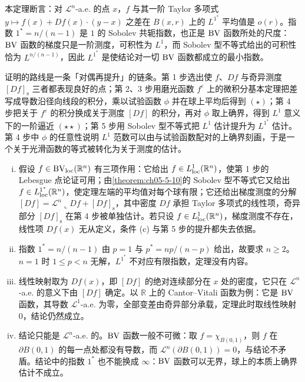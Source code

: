 \documentclass[../../main.tex]{subfiles}%
\begin{document}
\begin{remark}\label{remark:ch06-thm-6-1-动机}
本定理断言：对 $\mathcal{L}^n$-a.e. 的点 $x$，$f$ 与其一阶 Taylor 多项式 $y\mapsto f(x)+Df(x)\cdot(y-x)$ 之差在 $B(x,r)$ 上的 $L^{1^{*}}$ 平均值是 $o(r)$。指数 $1^{*}=n/(n-1)$ 是 $1$ 的 Sobolev 共轭指数，也正是 $\mathrm{BV}$ 函数所处的尺度：$\mathrm{BV}$ 函数的梯度只是一阶测度，可积性为 $L^1$，而 Sobolev 型不等式给出的可积性恰为 $L^{n/(n-1)}$，因此 $L^{1^{*}}$ 是使结论对一切 $\mathrm{BV}$ 函数都成立的最小指数。

证明的路线是一条「对偶再提升」的链条。第 1 步选出使 $f$、$Df$ 与奇异测度 $[Df]_{\mathrm{s}}$ 三者都表现良好的点；第 2、3 步用磨光函数 $f^\varepsilon$ 上的微积分基本定理把差写成导数沿径向线段的积分，乘以试验函数 $\phi$ 并在球上平均后得到 $(\star)$；第 4 步把关于 $f^\varepsilon$ 的积分换成关于测度 $[Df]$ 的积分，再对 $\phi$ 取上确界，得到 $L^1$ 意义下的一阶逼近 $(\star\star)$；第 5 步用 Sobolev 型不等式把 $L^1$ 估计提升为 $L^{1^{*}}$ 估计。第 4 步中 $\phi$ 的任意性说明 $L^1$ 范数可以由与试验函数配对的上确界刻画，于是一个关于光滑函数的等式被转化为关于测度的估计。
\end{remark}

\begin{remark}\label{remark:ch06-thm-6-1-条件}
\begin{enumerate}[(i)]
\item 假设 $f\in\mathrm{BV}_{\mathrm{loc}}(\mathbb{R}^n)$ 有三项作用：它给出 $f\in L^1_{\mathrm{loc}}(\mathbb{R}^n)$，使第 1 步的 Lebesgue 点论证可用；由\cref{theorem:ch05-5-10}的 Sobolev 型不等式它又给出 $f\in L^{1^{*}}_{\mathrm{loc}}(\mathbb{R}^n)$，使定理左端的平均值对每个球有限；它还给出梯度测度的分解 $[Df]=\mathcal{L}^n\llcorner Df+[Df]_{\mathrm{s}}$，其中密度 $Df$ 承担 Taylor 多项式的线性项，奇异部分 $[Df]_{\mathrm{s}}$ 在第 4 步被单独估计。若只设 $f\in L^1_{\mathrm{loc}}(\mathbb{R}^n)$，梯度测度不存在，线性项 $Df(x)$ 无从定义，条件 (c) 与第 5 步的提升都失去依据。%
\item 指数 $1^{*}=n/(n-1)$ 由 $p=1$ 与 $p^{*}=np/(n-p)$ 给出，故要求 $n\geqslant2$。$n=1$ 时 $1\leqslant p<n$ 无解，$L^{1^{*}}$ 不对应有限指数，定理没有内容。
\item 线性映射取为 $Df(x)$，即 $[Df]$ 的绝对连续部分在 $x$ 处的密度，它只在 $\mathcal{L}^n$-a.e. 的意义下由 $[Df]$ 确定。以 $\mathbb{R}$ 上的 Cantor--Vitali 函数为例：它是 $\mathrm{BV}$ 函数，其导数 $\mathcal{L}^1$-a.e. 为零，全部变差由奇异部分承载，定理此时取线性映射 $0$，结论仍然成立。
\item 结论只能是 $\mathcal{L}^n$-a.e. 的。$\mathrm{BV}$ 函数一般不可微：取 $f=\chi_{B(0,1)}$，则 $f$ 在 $\partial B(0,1)$ 的每一点处都没有导数，而 $\mathcal{L}^n(\partial B(0,1))=0$，与结论不矛盾。结论中的指数 $1^{*}$ 也不能换成 $\infty$：$\mathrm{BV}$ 函数可以无界，球上的本质上确界估计不成立。
\end{enumerate}
\end{remark}
\end{document}
